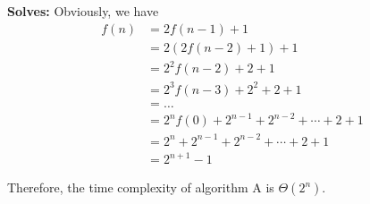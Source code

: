 \documentclass{article}
\begin{document}
\textbf{Solves:}
Obviously, we have
\begin{align*}
    f(n) & = 2f(n-1)+1 \\
         & = 2(2f(n-2)+1)+1 \\
         & = 2^2f(n-2)+2+1 \\
         & = 2^3f(n-3)+2^2+2+1 \\
         & = \ldots \\
         & = 2^nf(0)+2^{n-1}+2^{n-2}+\cdots+2+1 \\
         & = 2^n+2^{n-1}+2^{n-2}+\cdots+2+1 \\
         & = 2^{n+1}-1
\end{align*}

Therefore, the time complexity of algorithm A is $\boxed{\Theta(2^n)}$.
\end{document}
